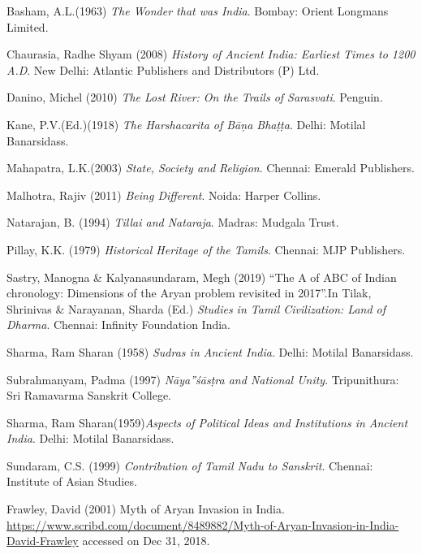 \begin{thebibliography}{99}
 Basham, A.L.(1963) \textit{The Wonder that was India}. Bombay: Orient Longmans Limited.

  Chaurasia, Radhe Shyam (2008) \textit{History of Ancient India: Earliest Times to 1200 A.D}. New Delhi: Atlantic Publishers and Distributors (P) Ltd.

  Danino, Michel (2010) \textit{The Lost River: On the Trails of Sarasvati}. Penguin.

  Kane, P.V.(Ed.)(1918) \textit{The Harshacarita of Bāņa Bhaṭṭa}. Delhi: Motilal Banarsidass.

  Mahapatra, L.K.(2003) \textit{State, Society and Religion}. Chennai: Emerald Publishers.

  Malhotra, Rajiv (2011) \textit{Being Different}. Noida: Harper Collins.

  Natarajan, B. (1994) \textit{Tillai and Nataraja}. Madras: Mudgala Trust.

  Pillay, K.K. (1979) \textit{Historical Heritage of the Tamils}. Chennai: MJP Publishers.

  Sastry, Manogna \& Kalyanasundaram, Megh (2019) “The A of ABC of Indian chronology: Dimensions of the Aryan problem revisited in 2017”.In Tilak, Shrinivas \& Narayanan, Sharda (Ed.) \textit{Studies in Tamil Civilization: Land of Dharma}. Chennai: Infinity Foundation India.

  Sharma, Ram Sharan (1958) \textit{Sudras in Ancient India}. Delhi: Motilal Banarsidass.

  Subrahmanyam, Padma (1997) \textit{Nāya”śāsṭra and National Unity}. Tripunithura: Sri Ramavarma Sanskrit College.

  Sharma, Ram Sharan(1959)\textit{Aspects of Political Ideas and Institutions in Ancient India}. Delhi: Motilal Banarsidass.

  Sundaram, C.S. (1999) \textit{Contribution of Tamil Nadu to Sanskrit}. Chennai: Institute of Asian Studies.

  Frawley, David (2001) Myth of Aryan Invasion in India. \url{https://www.scribd.com/document/8489882/Myth-of-Aryan-Invasion-in-India-David-Frawley} accessed on Dec 31, 2018.


\end{thebibliography}
